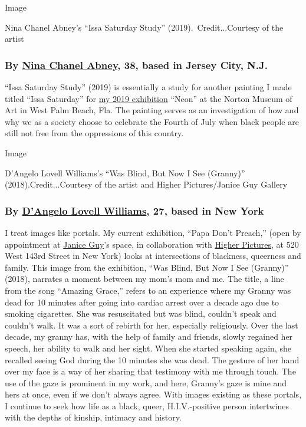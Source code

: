 Image

Nina Chanel Abney's ``Issa Saturday Study'' (2019).~Credit...Courtesy of
the artist

\hypertarget{by-nina-chanel-abney-38-based-in-jersey-city-nj}{%
\subsubsection{\texorpdfstring{\textbf{By}
\textbf{\href{https://ninachanel.com/}{Nina Chanel Abney}, 38, based in
Jersey City,
N.J.}}{By Nina Chanel Abney, 38, based in Jersey City, N.J.}}\label{by-nina-chanel-abney-38-based-in-jersey-city-nj}}

``Issa Saturday Study'' (2019) is essentially a study for another
painting I made titled ``Issa Saturday'' for
\href{https://www.norton.org/exhibitions/nina-chanel-abney}{my 2019
exhibition} ``Neon'' at the Norton Museum of Art in West Palm Beach,
Fla. The painting serves as an investigation of how and why we as a
society choose to celebrate the Fourth of July when black people are
still not free from the oppressions of this country.

Image

D'Angelo Lovell Williams's ``Was Blind, But Now I See (Granny)''
(2018).Credit...Courtesy of the artist and Higher Pictures/Janice Guy
Gallery

\hypertarget{by-dangelo-lovell-williams-27-based-in-new-york}{%
\subsubsection{\texorpdfstring{\textbf{By}
\textbf{\href{https://www.dangelolovellwilliams.com/}{D'Angelo Lovell
Williams}, 27, based in New
York}}{By D'Angelo Lovell Williams, 27, based in New York}}\label{by-dangelo-lovell-williams-27-based-in-new-york}}

I treat images like portals. My current exhibition, ``Papa Don't
Preach,'' (open by appointment at \href{https://janiceguy.com/}{Janice
Guy}'s space, in collaboration with
\href{https://higherpictures.com/}{Higher Pictures}, at 520 West 143rd
Street in New York) looks at intersections of blackness, queerness and
family. This image from the exhibition, ``Was Blind, But Now I See
(Granny)'' (2018), narrates a moment between my mom's mom and me. The
title, a line from the song ``Amazing Grace,'' refers to an experience
where my Granny was dead for 10 minutes after going into cardiac arrest
over a decade ago due to smoking cigarettes. She was resuscitated but
was blind, couldn't speak and couldn't walk. It was a sort of rebirth
for her, especially religiously. Over the last decade, my granny has,
with the help of family and friends, slowly regained her speech, her
ability to walk and her sight. When she started speaking again, she
recalled seeing God during the 10 minutes she was dead. The gesture of
her hand over my face is a way of her sharing that testimony with me
through touch. The use of the gaze is prominent in my work, and here,
Granny's gaze is mine and hers at once, even if we don't always agree.
With images existing as these portals, I continue to seek how life as a
black, queer, H.I.V.-positive person intertwines with the depths of
kinship, intimacy and history.

